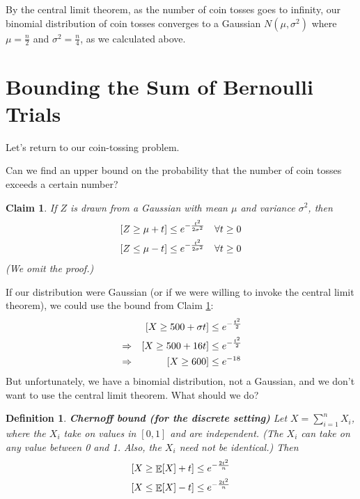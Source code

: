 \documentclass[11pt]{article}
\DeclareMathOperator*{\E}{\mathbb{E}}
\let\Pr\relax
\DeclareMathOperator*{\Pr}{\mathbb{P}}
\newtheorem{definition}[theorem]{Definition}
\newtheorem{claim}[theorem]{Claim}
\begin{document}
By the central limit theorem, as the number of coin tosses goes to infinity, our binomial distribution of coin tosses converges to a Gaussian $N(\mu, \sigma^2)$ where $\mu = \frac{n}{2}$ and $\sigma^2 = \frac{n}{4}$, as we calculated above.

\section{Bounding the Sum of Bernoulli Trials}

Let's return to our coin-tossing problem.

Can we find an upper bound on the probability that the number of coin tosses exceeds a certain number?

\begin{claim}\label{gaussianbound}
  If $Z$ is drawn from a Gaussian with mean $\mu$ and variance $\sigma^2$, then
  \begin{align*}
    \Pr[Z \ge \mu + t] &\le e^{-\frac{t^2}{2\sigma^2}} \quad \forall t \ge 0 \\
    \Pr[Z \le \mu - t] &\le e^{-\frac{t^2}{2\sigma^2}} \quad \forall t \ge 0
  \end{align*}
  (We omit the proof.)
\end{claim}

If our distribution were Gaussian (or if we were willing to invoke the central limit theorem), we could use the bound from Claim \ref{gaussianbound}:
\begin{align*}
  &&\Pr[X \ge 500 + \sigma t] &\le e^{-\frac{t^2}{2}} \\
  &\Rightarrow &\Pr[X \ge 500 + 16t] &\le e^{-\frac{t^2}{2}} \\
  &\Rightarrow &\Pr[X \ge 600] &\le e^{-18} \\
\end{align*}
But unfortunately, we have a binomial distribution, not a Gaussian, and we don't want to use the central limit theorem. What should we do?

\begin{definition}
  \textbf{Chernoff bound (for the discrete setting)}
  Let $X = \sum_{i=1}^n X_i$, where the $X_i$ take on values in $[0,1]$ and are independent. (The $X_i$ can take on any value between 0 and 1. Also, the $X_i$ need not be identical.)
  Then
  \begin{align*}
    \Pr[X \ge \E[X] + t] &\le e^{-\frac{2t^2}{n}} \\
    \Pr[X \le \E[X] - t] &\le e^{-\frac{2t^2}{n}}
  \end{align*}
\end{definition}
\end{document}
